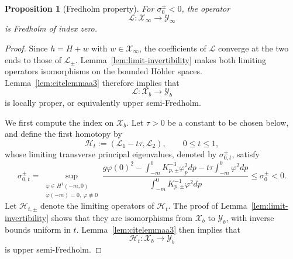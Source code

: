 \documentclass[12pt,letterpaper]{amsart}
\newtheorem{prop}[theorem]{Proposition}
\numberwithin{equation}{section}
\begin{document}
	
	\begin{prop}[Fredholm property]\label{prop:fredholm}
	For $\sigma_0^\pm<0$, the operator
		\[
		\mathscr L:\mathscr X_\infty\longrightarrow\mathscr Y_\infty
		\]
		is Fredholm of index zero.
	\end{prop}
	\begin{proof}
		{Since $h=H+w$ with $w\in\mathscr X_\infty$, the coefficients of $\mathscr L$ converge at the two ends to those of $\mathscr L_\pm$. Lemma~\ref{lem:limit-invertibility} makes both limiting operators isomorphisms on the bounded H\"older spaces. Lemma~\ref{lem:citelemmaa3} therefore implies that}
		\begin{equation*}
			\mathscr{L}:\mathscr{X}_b\to\mathscr{Y}_b
		\end{equation*}
		{is locally proper, or equivalently upper semi-Fredholm.}
		
		
		
		
		
		
		
		
		 {We first compute the index on $\mathscr X_b$. Let $\tau>0$ be a constant to be chosen below, and define the first homotopy by}
	\begin{equation*}
		\mathcal H_t:=({\mathscr L_1}-t\tau,{\mathscr L_2}),
		\qquad0\le t\le1 ,
	\end{equation*}
	{whose limiting transverse principal eigenvalues, denoted by $\sigma_{0,t}^\pm$, satisfy}
\begin{equation*}
	\sigma_{0,t}^\pm=
	\sup_{\substack{\varphi\in H^1(-m,0)\\
			\varphi(-m)=0,\ \varphi\not\equiv0}}
	\frac{g\varphi(0)^2-
		\displaystyle\int_{-m}^0K_{p,\pm}^{-3}\varphi_p^2d p-
		t\tau\displaystyle\int_{-m}^0\varphi^2d p}
	{\displaystyle\int_{-m}^0K_{p,\pm}^{-1}\varphi^2d p}
	\le\sigma_0^\pm<0.
\end{equation*}
	{Let $\mathcal H_{t,\pm}$ denote the limiting operators of $\mathcal H_t$. The proof of Lemma~\ref{lem:limit-invertibility} shows that they are isomorphisms from $\mathscr X_b$ to $\mathscr Y_b$, with inverse bounds uniform in $t$. Lemma~\ref{lem:citelemmaa3} then implies that}
	\begin{equation*}
		\mathcal{H}_t:\mathscr{X}_b\to\mathscr{Y}_b
	\end{equation*}
	is upper semi-Fredholm.
	

\end{proof}
\end{document}
